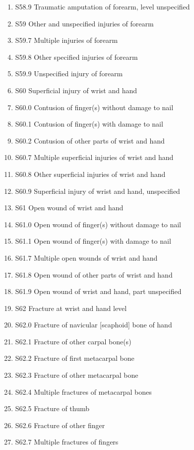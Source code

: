 \documentclass[
]{scrartcl}
\begin{document}
\begin{itemize}
\begin{enumerate}
  \item
    S58.9 Traumatic amputation of forearm, level unspecified
  \item
    S59 Other and unspecified injuries of forearm
  \item
    S59.7 Multiple injuries of forearm
  \item
    S59.8 Other specified injuries of forearm
  \item
    S59.9 Unspecified injury of forearm
  \item
    S60 Superficial injury of wrist and hand
  \item
    S60.0 Contusion of finger(s) without damage to nail
  \item
    S60.1 Contusion of finger(s) with damage to nail
  \item
    S60.2 Contusion of other parts of wrist and hand
  \item
    S60.7 Multiple superficial injuries of wrist and hand
  \item
    S60.8 Other superficial injuries of wrist and hand
  \item
    S60.9 Superficial injury of wrist and hand, unspecified
  \item
    S61 Open wound of wrist and hand
  \item
    S61.0 Open wound of finger(s) without damage to nail
  \item
    S61.1 Open wound of finger(s) with damage to nail
  \item
    S61.7 Multiple open wounds of wrist and hand
  \item
    S61.8 Open wound of other parts of wrist and hand
  \item
    S61.9 Open wound of wrist and hand, part unspecified
  \item
    S62 Fracture at wrist and hand level
  \item
    S62.0 Fracture of navicular {[}scaphoid{]} bone of hand
  \item
    S62.1 Fracture of other carpal bone(s)
  \item
    S62.2 Fracture of first metacarpal bone
  \item
    S62.3 Fracture of other metacarpal bone
  \item
    S62.4 Multiple fractures of metacarpal bones
  \item
    S62.5 Fracture of thumb
  \item
    S62.6 Fracture of other finger
  \item
    S62.7 Multiple fractures of fingers

\end{enumerate}
\end{itemize}
\end{document}
